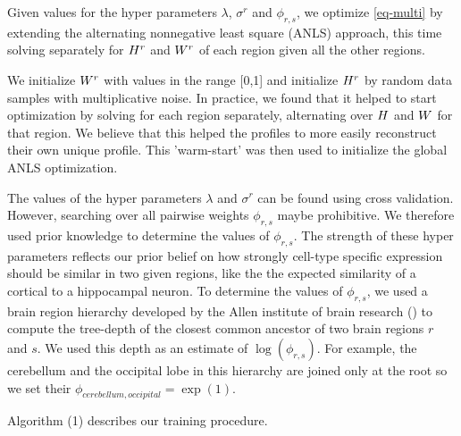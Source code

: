 Given values for the hyper parameters $\lambda$, $\sigma^r$ and $\phi_{r,s}$, 
we optimize \eqref{eq-multi} by extending the alternating nonnegative least square (ANLS) approach, this time solving separately for ${{H}^r}$ and ${W^r}$ of each region given all the other regions. %

We initialize $W^r$ with values in the range [0,1] and initialize ${H}^r$ by random data samples with multiplicative noise. In practice, we found that it helped to start optimization by solving for each region separately, alternating over ${H}$ and $W$ for that region. We believe that this helped the profiles to more easily reconstruct their own unique profile. This 'warm-start' was then used to initialize the global ANLS optimization. 

The values of the hyper parameters $\lambda$ and $\sigma^r$ can be found using cross validation. However, searching over all pairwise weights $\phi_{r,s}$ maybe prohibitive. We therefore used prior knowledge to determine the values of $\phi_{r,s}$. The strength of these hyper parameters reflects our prior belief on how strongly cell-type specific expression should be similar in two given regions, like the the expected similarity of a cortical to a hippocampal neuron.
To determine the values of $\phi_{r,s}$, we used a brain region hierarchy developed by the Allen institute of brain research () to compute the tree-depth of the closest common ancestor of two brain regions $r$ and $s$. We used this depth as an estimate of $\log(\phi_{r,s})$. For example, the cerebellum and the occipital lobe  in this hierarchy are joined only at the root so we set their $\phi_{cerebellum, occipital} = \exp(1)$. 

Algorithm (1) describes our training procedure.

